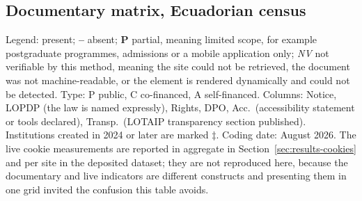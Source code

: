 \documentclass[pdflatex,sn-basic,Numbered,iicol]{sn-jnl}
\newcommand{\si}{\ding{51}}
\newcommand{\no}{\textcolor{gris}{\textbf{--}}}
\newcommand{\nv}{\textsl{\footnotesize NV}}
\theoremstyle{thmstyleone}
\theoremstyle{thmstyletwo}
\theoremstyle{thmstylethree}
\begin{document}
\begin{appendices}
		\section{Documentary matrix, Ecuadorian census}\label{ap:ecuador}
		\setcounter{table}{0}\setcounter{figure}{0}
		
		Legend: \si{} present; \no{} absent; \textbf{P} partial, meaning limited scope, for example postgraduate programmes, admissions or a mobile application only; \nv{} not verifiable by this method, meaning the site could not be retrieved, the document was not machine-readable, or the element is rendered dynamically and could not be detected. Type: P public, C co-financed, A self-financed. Columns: Notice, LOPDP (the law is named expressly), Rights, DPO, Acc.\ (accessibility statement or tools declared), Transp.\ (LOTAIP transparency section published). Institutions created in 2024 or later are marked $\ddagger$. Coding date: August 2026. The live cookie measurements are reported in aggregate in Section~\ref{sec:results-cookies} and per site in the deposited dataset; they are not reproduced here, because the documentary and live indicators are different constructs and presenting them in one grid invited the confusion this table avoids.
		

\end{appendices}
\end{document}
